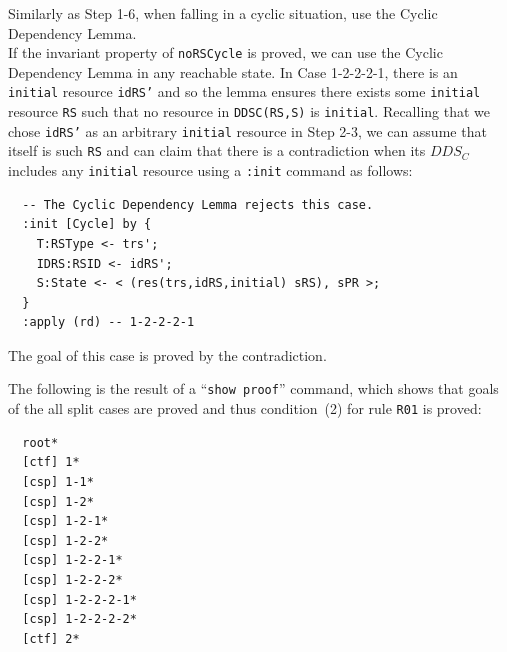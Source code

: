 \documentclass[12pt]{report}
\newcommand{\stt}[1]{{\small{\tt {#1}}}}
\begin{document}
 Similarly as Step 1-6, when falling in a
cyclic situation, use the Cyclic Dependency Lemma. \\
If the invariant property of {\tt noRSCycle} is proved, we can use the
Cyclic Dependency Lemma in any reachable state. In Case 1-2-2-2-1,
there is an {\tt initial} resource {\tt idRS'} and so the lemma ensures
there exists some {\tt initial} resource {\tt RS} such that no
resource in \stt{DDSC(RS,S)} is {\tt initial}. Recalling that we chose
{\tt idRS'} as an arbitrary {\tt initial} resource in Step 2-3, we can
assume that itself is such {\tt RS} and can claim that there is a
contradiction when its $\mathit{DDS_C}$ includes any {\tt initial} resource
using a {\tt :init} command as follows:
\small
\begin{verbatim}
  -- The Cyclic Dependency Lemma rejects this case.
  :init [Cycle] by {
    T:RSType <- trs';
    IDRS:RSID <- idRS';
    S:State <- < (res(trs,idRS,initial) sRS), sPR >;
  }
  :apply (rd) -- 1-2-2-2-1
\end{verbatim}
\normalsize
The goal of this case is proved by the contradiction.

The following is the result of a ``\stt{show proof}'' command, which shows
that goals of the all split cases are proved and thus
condition~(2) for rule {\tt R01} is proved:
\small
\begin{verbatim}
  root*
  [ctf] 1*
  [csp] 1-1*
  [csp] 1-2*
  [csp] 1-2-1*
  [csp] 1-2-2*
  [csp] 1-2-2-1*
  [csp] 1-2-2-2*
  [csp] 1-2-2-2-1*
  [csp] 1-2-2-2-2*
  [ctf] 2*
\end{verbatim}
\normalsize
\end{document}

